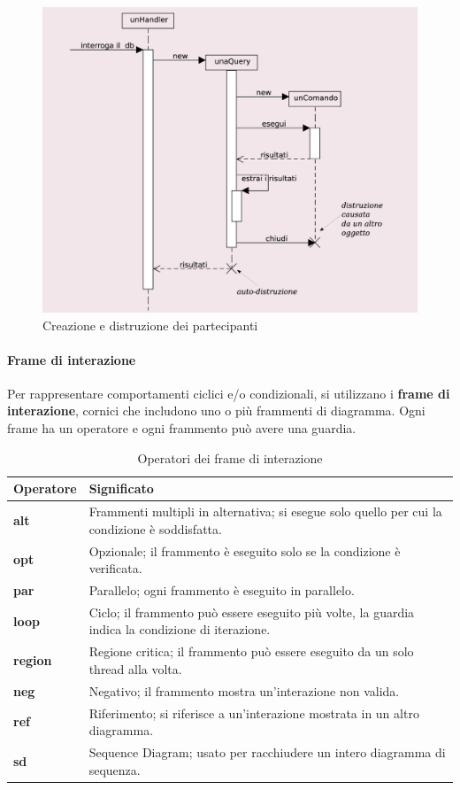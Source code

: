 \begin{figure}[H]
    \centering
    \includegraphics[width=0.75\linewidth]{assets/UML/sequence/sequence-3.png}
    \caption{Creazione e distruzione dei partecipanti}
\end{figure}

\paragraph{Frame di interazione}
Per rappresentare comportamenti ciclici e/o condizionali, si utilizzano i \textbf{frame di interazione}, cornici che includono uno o più frammenti di diagramma. Ogni frame ha un operatore e ogni frammento può avere una guardia.

\begin{table}[H]
    \centering
    \begin{tabularx}{\textwidth}{|l|X|}
        \hline
        \textbf{Operatore} & \textbf{Significato} \\
        \hline
        \textbf{alt} & Frammenti multipli in alternativa; si esegue solo quello per cui la condizione è soddisfatta. \\
        \hline
        \textbf{opt} & Opzionale; il frammento è eseguito solo se la condizione è verificata. \\
        \hline
        \textbf{par} & Parallelo; ogni frammento è eseguito in parallelo. \\
        \hline
        \textbf{loop} & Ciclo; il frammento può essere eseguito più volte, la guardia indica la condizione di iterazione. \\
        \hline
        \textbf{region} & Regione critica; il frammento può essere eseguito da un solo thread alla volta. \\
        \hline
        \textbf{neg} & Negativo; il frammento mostra un’interazione non valida. \\
        \hline
        \textbf{ref} & Riferimento; si riferisce a un’interazione mostrata in un altro diagramma. \\
        \hline
        \textbf{sd} & Sequence Diagram; usato per racchiudere un intero diagramma di sequenza. \\
        \hline
    \end{tabularx}
    \caption{Operatori dei frame di interazione}
\end{table}

